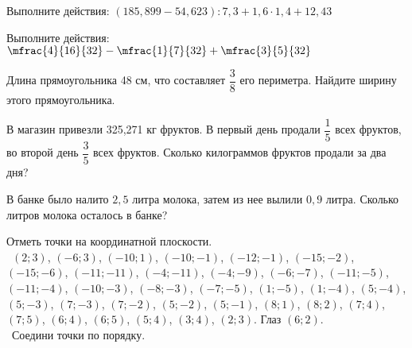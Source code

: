 \begin{exam}
	\begin{listofex}
		\item Выполните действия: \( (185,899-54,623):7,3+1,6\cdot1,4+12,43 \)
		\item Выполните действия: \( \mfrac{4}{16}{32}-\mfrac{1}{7}{32}+\mfrac{3}{5}{32} \)
		\item Длина прямоугольника 48 см, что составляет \( \dfrac{3}{8} \) его периметра. Найдите ширину этого прямоугольника.
		\item В магазин привезли 325,271 кг фруктов. В первый день продали \( \dfrac{1}{5} \) всех фруктов, во второй день \( \dfrac{3}{5} \)  всех фруктов. Сколько килограммов фруктов продали за два дня?
		\item В банке  было налито \( 2,5 \)  литра молока, затем из нее вылили  \( 0,9 \) литра. Сколько литров молока осталось в банке?
		\item Отметь точки на координатной плоскости.\\\ \( (2; 3) \), \( (-6; 3) \), \( (-10; 1) \), \( (-10; -1) \), \( (-12; -1) \), \( (-15; -2) \), \( (-15; -6) \), \( (-11; -11) \), \( (-4; -11) \), \( (-4; -9) \), \( (-6;-7) \), \( (-11; -5) \), \( (-11; -4) \), \( (-10;-3) \), \( (-8; -3) \), \( (-7; -5) \), \( (1; -5) \), \( (1; -4) \), \( (5; -4) \), \( (5; -3) \), \( (7; -3) \), \( (7; -2) \), \( (5; -2) \), \( (5; -1) \), \( (8; 1) \), \( (8; 2) \), \( (7; 4) \), \( (7; 5) \), \( (6; 4) \), \( (6; 5) \), \( (5; 4) \), \( (3; 4) \), \( (2; 3) \). Глаз \( (6; 2) \).\\\ Соедини точки по порядку.
	\end{listofex}
\end{exam}
